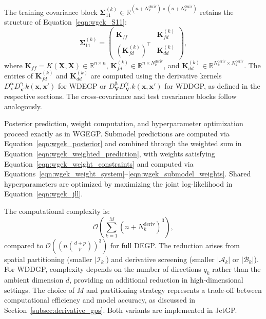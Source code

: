 \documentclass[12pt]{article}
\begin{document}
The training covariance block $\boldsymbol{\Sigma}^{(k)}_{11} \in \mathbb{R}^{(n + N_k^{\text{deriv}}) \times (n + N_k^{\text{deriv}})}$ retains the structure of Equation~\eqref{eqn:wgek_S11}:
\begin{equation}
	\label{eqn:wdegp_S11}
	\boldsymbol{\Sigma}^{(k)}_{11} =
	\begin{pmatrix}
		\mathbf{K}_{ff} & \mathbf{K}_{fd}^{(k)} \\
		\left(\mathbf{K}_{fd}^{(k)}\right)^\top & \mathbf{K}_{dd}^{(k)}
	\end{pmatrix},
\end{equation}
where $\mathbf{K}_{ff} = K(\mathbf{X}, \mathbf{X}) \in \mathbb{R}^{n \times n}$, $\mathbf{K}_{fd}^{(k)} \in \mathbb{R}^{n \times N_k^{\text{deriv}}}$, and $\mathbf{K}_{dd}^{(k)} \in \mathbb{R}^{N_k^{\text{deriv}} \times N_k^{\text{deriv}}}$. The entries of $\mathbf{K}_{fd}^{(k)}$ and $\mathbf{K}_{dd}^{(k)}$ are computed using the derivative kernels $D_{\mathbf{x}}^{\boldsymbol{\alpha}} D_{\mathbf{x}'}^{\boldsymbol{\gamma}} k(\mathbf{x}, \mathbf{x}')$ for WDEGP or $D_{\mathbf{V}}^{\boldsymbol{\beta}} D_{\mathbf{V}'}^{\boldsymbol{\gamma}} k(\mathbf{x}, \mathbf{x}')$ for WDDGP, as defined in the respective sections. The cross-covariance and test covariance blocks follow analogously.

Posterior prediction, weight computation, and hyperparameter optimization proceed exactly as in WGEGP. Submodel predictions are computed via Equation~\eqref{eqn:wgek_posterior} and combined through the weighted sum in Equation~\eqref{eqn:wgek_weighted_prediction}, with weights satisfying Equation~\eqref{eqn:wgek_weight_constraints} and computed via Equations~\eqref{eqn:wgek_weight_system}--\eqref{eqn:wgek_submodel_weights}. Shared hyperparameters are optimized by maximizing the joint log-likelihood in Equation~\eqref{eqn:wgek_jll}.

The computational complexity is:
\begin{equation}
	\mathcal{O}\left(\sum_{k=1}^M (n + N_k^{\text{deriv}})^3\right),
\end{equation}
compared to $\mathcal{O}((n\binom{d+p}{p})^3)$ for full DEGP. The reduction arises from spatial partitioning (smaller $|\mathcal{I}_k|$) and derivative screening (smaller $|\mathcal{A}_k|$ or $|\mathcal{B}_k|$). For WDDGP, complexity depends on the number of directions $q_k$ rather than the ambient dimension $d$, providing an additional reduction in high-dimensional settings. The choice of $M$ and partitioning strategy represents a trade-off between computational efficiency and model accuracy, as discussed in Section~\ref{subsec:derivative_gps}. Both variants are implemented in JetGP.
\end{document}
